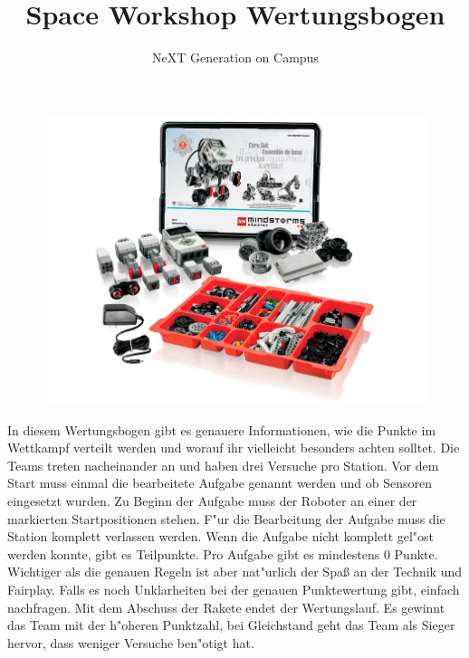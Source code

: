 \documentclass[12pt,colorbacktitle,accentcolor=tud1c]{tudexercise}
\title{Space Workshop \newline Wertungsbogen }
\subtitle{NeXT Generation on Campus}
\begin{document}
	\maketitle	
	\bigskip
	\bigskip
	\bigskip
	\bigskip
	\bigskip
	\bigskip
	\begin{figure}[h]
			\centering 
			\includegraphics[width=\textwidth]{images/title.jpg}
	\end{figure}
	\newpage
	
	\bigskip
	In diesem Wertungsbogen gibt es genauere Informationen, wie die Punkte im Wettkampf verteilt werden und worauf ihr vielleicht besonders achten solltet.
	Die Teams treten nacheinander an und haben drei Versuche pro Station.
	Vor dem Start muss einmal die bearbeitete Aufgabe genannt werden und ob Sensoren eingesetzt wurden.
	Zu Beginn der Aufgabe muss der Roboter an einer der markierten Startpositionen stehen. F"ur die Bearbeitung der Aufgabe muss die Station komplett verlassen werden.
	Wenn die Aufgabe nicht komplett gel"ost werden konnte, gibt es Teilpunkte. Pro Aufgabe gibt es mindestens 0 Punkte.\\
	Wichtiger als die genauen Regeln ist aber nat"urlich der Spa\ss{} an der Technik und Fairplay.
	Falls es noch Unklarheiten bei der genauen Punktewertung gibt, einfach nachfragen.
	Mit dem Abschuss der Rakete endet der Wertungslauf.
	Es gewinnt das Team mit der h"oheren Punktzahl, bei Gleichstand geht das Team als Sieger hervor, dass weniger Versuche ben"otigt hat.
	
	
	
\end{document}
